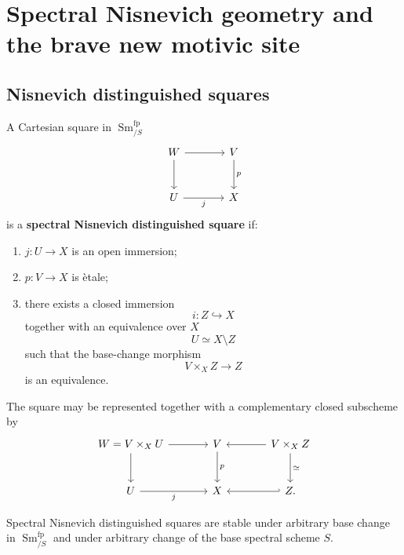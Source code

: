 \section{Spectral Nisnevich geometry and the brave new motivic site}
\label{sec:spectral-nisnevich-motivic-input}

\subsection{Nisnevich distinguished squares}

\begin{definition}
\label{def:spectral-nisnevich-square}
A Cartesian square in $\operatorname{Sm}^{\mathrm{fp}}_{/S}$
\[
\begin{tikzcd}[column sep=large, row sep=large]
    W
        \arrow[r]
        \arrow[d]
    &
    V
        \arrow[d, "p"]
    \\
    U
        \arrow[r, "j"']
    &
    X
\end{tikzcd}
\]
is a \textbf{spectral Nisnevich distinguished square} if:
\begin{enumerate}[label=(\roman*)]
    \item $j:U\to X$ is an open immersion;

    \item $p:V\to X$ is \`etale;

    \item there exists a closed immersion
    \[
        i
        \colon
        Z
        \hookrightarrow
        X
    \]
    together with an equivalence over $X$
    \[
        U
        \simeq
        X\setminus Z
    \]
    such that the base-change morphism
    \[
        V\times_XZ
        \longrightarrow
        Z
    \]
    is an equivalence.
\end{enumerate}
\end{definition}

The square may be represented together with a complementary closed
subscheme by
\[
\begin{tikzcd}[column sep=large, row sep=large]
    W=V\times_XU
        \arrow[r]
        \arrow[d]
    &
    V
        \arrow[d, "p"]
    &
    V\times_XZ
        \arrow[l]
        \arrow[d, "\simeq"]
    \\
    U
        \arrow[r, "j"']
    &
    X
    &
    Z
        \arrow[l, hook'].
\end{tikzcd}
\]

\begin{proposition}
\label{prop:nisnevich-square-base-change}
Spectral Nisnevich distinguished squares are stable under arbitrary base
change in $\operatorname{Sm}^{\mathrm{fp}}_{/S}$ and under arbitrary
change of the base spectral scheme $S$.
\end{proposition}

